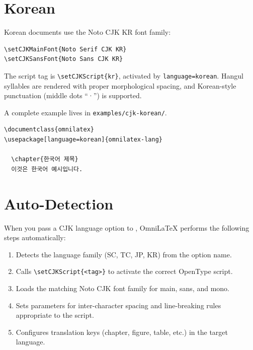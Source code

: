 \section{Korean}

Korean documents use the Noto CJK KR font family:

\begin{verbatim}
\setCJKMainFont{Noto Serif CJK KR}
\setCJKSansFont{Noto Sans CJK KR}
\end{verbatim}

The script tag is \verb|\setCJKScript{kr}|, activated by
\texttt{language=korean}.  Hangul syllables are rendered with proper
morphological spacing, and Korean-style punctuation (middle dots ``·'')
is supported.

A complete example lives in \texttt{examples/cjk-korean/}.

\begin{verbatim}
\documentclass{omnilatex}
\usepackage[language=korean]{omnilatex-lang}

  \chapter{한국어 제목}
  이것은 한국어 예시입니다.

\end{verbatim}

\section{Auto-Detection}

When you pass a CJK language option to , OmniLaTeX
performs the following steps automatically:

\begin{enumerate}
  \item Detects the language family (SC, TC, JP, KR) from the option name.
  \item Calls \verb|\setCJKScript{<tag>}| to activate the correct OpenType
        script.
  \item Loads the matching Noto CJK font family for main, sans, and mono.
  \item Sets  parameters for inter-character spacing and
        line-breaking rules appropriate to the script.
  \item Configures translation keys (chapter, figure, table, etc.) in the
        target language.
\end{enumerate}

